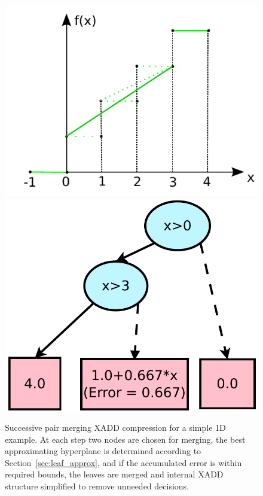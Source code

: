 \begin{figure}[t!]
{\begin{minipage}{.25\textwidth}
	\includegraphics[width=\textwidth]{Figures/stepfun/succ3.pdf}
	\end{minipage}
	\begin{minipage}{.2\textwidth}
	\includegraphics[width=\textwidth]{Figures/xadds/succ3xadd.pdf}
	\end{minipage}
	 \label{step2}
}
\caption{ \footnotesize Successive pair merging XADD compression for a simple 1D example.
At each step two nodes are chosen for merging, the best approximating
hyperplane is determined according to Section~\ref{sec:leaf_approx},
and if the accumulated error is within required bounds, the leaves are
merged and internal XADD structure simplified to remove unneeded
decisions.}  \label{fig:steplining}
\end{figure}

